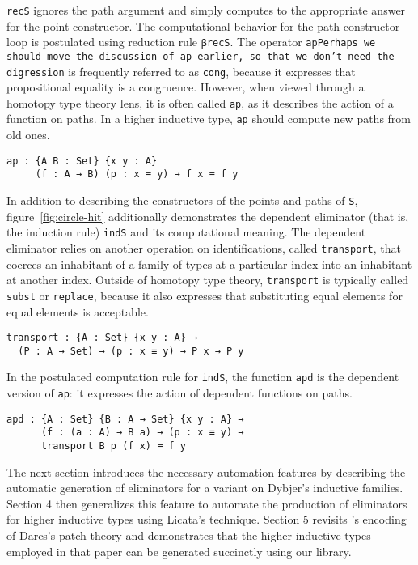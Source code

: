 \documentclass[sigplan,10pt]{acmart}
\begin{document}
{\tt recS} ignores the path argument and simply computes to the appropriate answer for the point constructor. The computational behavior for the path constructor loop is postulated using reduction rule {\tt βrecS}.
The operator \texttt{ap}\texttt{Perhaps we should move the discussion of ap earlier, so that we don't need the digression} is frequently referred to as \texttt{cong}, because it expresses that propositional equality is a congruence.
However, when viewed through a homotopy type theory lens, it is often called \texttt{ap}, as it describes the action of a function on paths.
In a higher inductive type, \texttt{ap} should compute new paths from old ones.
\begin{center}
\begin{BVerbatim}
ap : {A B : Set} {x y : A}
     (f : A → B) (p : x ≡ y) → f x ≡ f y
\end{BVerbatim}
\end{center}

In addition to describing the constructors of the points and paths of \texttt{S}, figure~\ref{fig:circle-hit} additionally demonstrates the dependent eliminator (that is, the induction rule) {\tt indS} and its computational meaning.
The dependent eliminator relies on another operation on identifications, called \texttt{transport}, that coerces an inhabitant of a family of types at a particular index into an inhabitant at another index.
Outside of homotopy type theory, \texttt{transport} is typically called \texttt{subst} or \texttt{replace}, because it also expresses that substituting equal elements for equal elements is acceptable.
\begin{center}
\begin{Verbatim}
transport : {A : Set} {x y : A} → 
  (P : A → Set) → (p : x ≡ y) → P x → P y
\end{Verbatim}
\end{center}

In the postulated computation rule for \texttt{indS}, the function {\tt apd} is the dependent version of \texttt{ap}: it expresses the action of dependent functions on paths.
\begin{center}
\begin{Verbatim}
apd : {A : Set} {B : A → Set} {x y : A} → 
      (f : (a : A) → B a) → (p : x ≡ y) →
      transport B p (f x) ≡ f y
\end{Verbatim}
\end{center}

The next section introduces the necessary automation features by describing the automatic generation of eliminators for a variant on Dybjer's inductive families. Section 4 then generalizes this feature to automate the production of eliminators for higher inductive types using Licata's technique. Section 5 revisits \citeauthor{Angiuli-2014}'s encoding of Darcs's patch theory \citep{Angiuli-2014} and demonstrates that the higher inductive types employed in that paper can be generated succinctly using our library.
\end{document}
